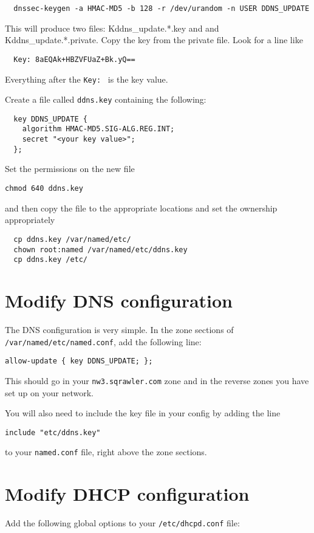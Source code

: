 \documentclass{article}
\begin{document}
\begin{verbatim}
  dnssec-keygen -a HMAC-MD5 -b 128 -r /dev/urandom -n USER DDNS_UPDATE
\end{verbatim}

This will produce two files: Kddns\_update.*.key and and Kddns\_update.*.private.  Copy the key from the
private file.  Look for a line like 

\begin{verbatim}
  Key: 8aEQAk+HBZVFUaZ+Bk.yQ==
\end{verbatim}

Everything after the \texttt{Key: } is the key value.

Create a file called \texttt{ddns.key} containing the following:

\begin{verbatim}
  key DDNS_UPDATE {
    algorithm HMAC-MD5.SIG-ALG.REG.INT;
    secret "<your key value>";
  };
\end{verbatim}

Set the permissions on the new file

\texttt{chmod 640 ddns.key}

and then copy the file to the appropriate locations and set the ownership appropriately

\begin{verbatim}
  cp ddns.key /var/named/etc/
  chown root:named /var/named/etc/ddns.key
  cp ddns.key /etc/
\end{verbatim}

\section{Modify DNS configuration}
The DNS configuration is very simple.  In the zone sections of \texttt{/var/named/etc/named.conf}, add the following line:

\texttt{allow-update \{ key DDNS\_UPDATE; \};}

This should go in your \texttt{nw3.sqrawler.com} zone and in the reverse zones you have set up on your 
network.

You will also need to include the key file in your config by adding the line

\begin{verbatim}
include "etc/ddns.key"
\end{verbatim}

to your \texttt{named.conf} file, right above the zone sections.

\section{Modify DHCP configuration}
Add the following global options to your \texttt{/etc/dhcpd.conf} file:
\end{document}
